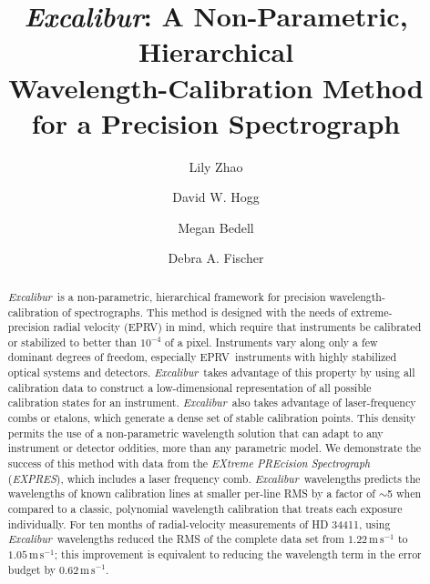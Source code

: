 \documentclass[modern]{aastex63}
\newcommand{\project}[1]{\textsl{#1}}
\newcommand{\name}{\project{Excalibur}}
\newcommand{\acronym}[1]{{\small{#1}}}
\newcommand{\expres}{\project{\acronym{EXPRES}}}
\newcommand{\eprv}{\acronym{EPRV}}
\newcommand{\mps}{\mathrm{m\,s^{-1}}}
\begin{document}
\title{\name:
  A Non-Parametric, Hierarchical \\
  Wavelength-Calibration Method for a Precision Spectrograph}


\author[0000-0002-3852-3590]{Lily Zhao}

\author[0000-0003-2866-9403]{David W. Hogg}

\author[0000-0001-9907-7742]{Megan Bedell}

\author[0000-0003-2221-0861]{Debra A. Fischer}

\begin{abstract}\noindent%
\name\ is a non-parametric, hierarchical framework for precision wavelength-calibration of spectrographs.  This method is designed with the needs of extreme-precision radial velocity (\eprv) in mind, which require that instruments be calibrated or stabilized to better than $10^{-4}$ of a pixel.  Instruments vary along only a few dominant degrees of freedom, especially \eprv\ instruments with highly stabilized optical systems and detectors.  \name\ takes advantage of this property by using all calibration data to construct a low-dimensional representation of all possible calibration states for an instrument.  \name\ also takes advantage of laser-frequency combs or etalons, which generate a dense set of stable calibration points.  This density permits the use of a non-parametric wavelength solution that can adapt to any instrument or detector oddities, more than any parametric model.  We demonstrate the success of this method with data from the \textsl{EXtreme PREcision Spectrograph} (\expres), which includes a laser frequency comb.  \name\ wavelengths predicts the wavelengths of known calibration lines at smaller per-line RMS by a factor of $\sim$5 when compared to a classic, polynomial wavelength calibration that treats each exposure individually.  For ten months of radial-velocity measurements of HD 34411, using \name\ wavelengths reduced the RMS of the complete data set from $1.22\, \mps$ to $1.05\, \mps$; this improvement is equivalent to reducing the wavelength term in the error budget by $0.62\,\mps$.
\end{abstract}
\end{document}
